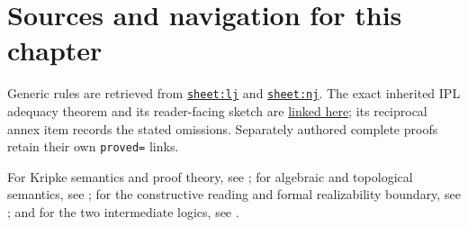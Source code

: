 \section{Sources and navigation for this chapter}

Generic rules are retrieved from
\hyperref[sheet:lj]{\texttt{sheet:lj}} and
\hyperref[sheet:nj]{\texttt{sheet:nj}}.  The exact inherited IPL adequacy
theorem and its reader-facing sketch are
\hyperref[thm:p08-source-ipl-adequacy]{linked here}; its reciprocal annex item
records the stated omissions.  Separately authored complete proofs retain
their own \texttt{proved=} links.

For Kripke semantics and proof theory, see
\cite{Kripke1965,TroelstraSchwichtenberg2000,TroelstraVanDalen1988}; for
algebraic and topological semantics, see
\cite{RasiowaSikorski1963,McKinseyTarski1946}; for the constructive reading and
formal realizability boundary, see
\cite{Brouwer1908,Heyting1956,Kleene1945}; and for the two intermediate logics,
see \cite{Jankov1968WeakExcludedMiddle,Dummett1959}.
